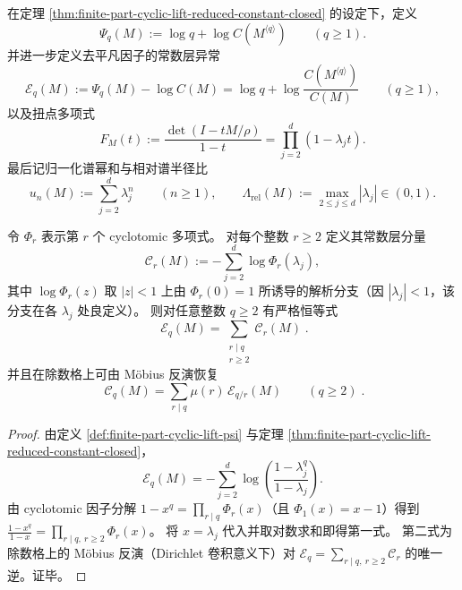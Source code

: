 \begin{definition}\label{def:finite-part-cyclic-lift-psi}
在定理 \ref{thm:finite-part-cyclic-lift-reduced-constant-closed} 的设定下，定义
\[
\Psi_q(M):=\log q+\log C(M^{\langle q\rangle})\qquad(q\ge 1).
\]
并进一步定义去平凡因子的常数层异常
\[
\mathcal{E}_q(M):=\Psi_q(M)-\log C(M)
=\log q+\log\frac{C(M^{\langle q\rangle})}{C(M)}\qquad(q\ge 1),
\]
以及扭点多项式
\[
F_M(t):=\frac{\det(I-tM/\rho)}{1-t}=\prod_{j=2}^{d}(1-\lambda_j t).
\]
最后记归一化谱幂和与相对谱半径比
\[
u_n(M):=\sum_{j=2}^{d}\lambda_j^{n}\qquad(n\ge 1),
\qquad
\Lambda_{\mathrm{rel}}(M):=\max_{2\le j\le d}|\lambda_j|\in(0,1).
\]
\end{definition}

\begin{proposition}\label{prop:finite-part-cyclic-lift-cyclotomic-divisor-mobius}
令 \(\Phi_r\) 表示第 \(r\) 个 cyclotomic 多项式。
对每个整数 \(r\ge 2\) 定义其常数层分量
\[
\mathcal{C}_r(M):=-\sum_{j=2}^{d}\log \Phi_r(\lambda_j),
\]
其中 \(\log\Phi_r(z)\) 取 \(|z|<1\) 上由 \(\Phi_r(0)=1\) 所诱导的解析分支（因 \(|\lambda_j|<1\)，该分支在各 \(\lambda_j\) 处良定义）。
则对任意整数 \(q\ge 2\) 有严格恒等式
\[
\boxed{\;
\mathcal{E}_q(M)=\sum_{\substack{r\mid q\\ r\ge 2}}\mathcal{C}_r(M)\; }.
\]
并且在除数格上可由 Möbius 反演恢复
\[
\boxed{\;
\mathcal{C}_q(M)=\sum_{r\mid q}\mu(r)\,\mathcal{E}_{q/r}(M)\qquad(q\ge 2)\; }.
\]
\end{proposition}
\begin{proof}
由定义 \ref{def:finite-part-cyclic-lift-psi} 与定理 \ref{thm:finite-part-cyclic-lift-reduced-constant-closed}，
\[
\mathcal{E}_q(M)
=-\sum_{j=2}^{d}\log\!\left(\frac{1-\lambda_j^{q}}{1-\lambda_j}\right).
\]
由 cyclotomic 因子分解 \(1-x^{q}=\prod_{r\mid q}\Phi_r(x)\)（且 \(\Phi_1(x)=x-1\)）得到
\(
\frac{1-x^{q}}{1-x}=\prod_{r\mid q,\ r\ge 2}\Phi_r(x)
\)。
将 \(x=\lambda_j\) 代入并取对数求和即得第一式。
第二式为除数格上的 Möbius 反演（Dirichlet 卷积意义下）对 \(\mathcal{E}_q=\sum_{r\mid q,\ r\ge 2}\mathcal{C}_r\) 的唯一逆。证毕。
\end{proof}

